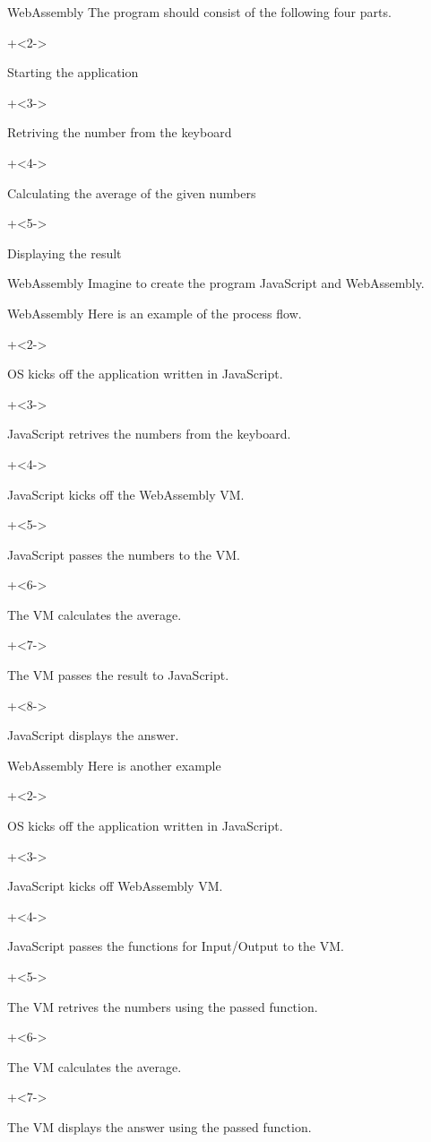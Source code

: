 \begin{frame}{WebAssembly}{}
    The program should consist of the following four parts.
    \vspace{2ex}

    \begin{enumerate}
        \onslide+<2->{\item Starting the application}
        \onslide+<3->{\item Retriving the number from the keyboard}
        \onslide+<4->{\item Calculating the average of the given numbers}
        \onslide+<5->{\item Displaying the result}
    \end{enumerate}
\end{frame}


\begin{frame}{WebAssembly}{}
    Imagine to create the program JavaScript and WebAssembly.
\end{frame}


\begin{frame}{WebAssembly}{}
    Here is an example of the process flow.
    \vspace{2ex}

    \begin{enumerate}
        \onslide+<2->{\item OS kicks off the application written in JavaScript.}
        \onslide+<3->{\item JavaScript retrives the numbers from the keyboard.}
        \onslide+<4->{\item JavaScript kicks off the WebAssembly VM.}
        \onslide+<5->{\item JavaScript passes the numbers to the VM.}
        \onslide+<6->{\item The VM calculates the average.}
        \onslide+<7->{\item The VM passes the result to JavaScript.}
        \onslide+<8->{\item JavaScript displays the answer.}
    \end{enumerate}
\end{frame}


\begin{frame}{WebAssembly}{}
    Here is another example
    \vspace{2ex}

    \begin{enumerate}
        \onslide+<2->{\item OS kicks off the application written in JavaScript.}
        \onslide+<3->{\item JavaScript kicks off WebAssembly VM.}
        \onslide+<4->{\item JavaScript passes the functions for Input/Output to the VM.}
        \onslide+<5->{\item The VM retrives the numbers using the passed function.}
        \onslide+<6->{\item The VM calculates the average.}
        \onslide+<7->{\item The VM displays the answer using the passed function.}
    \end{enumerate}
\end{frame}


